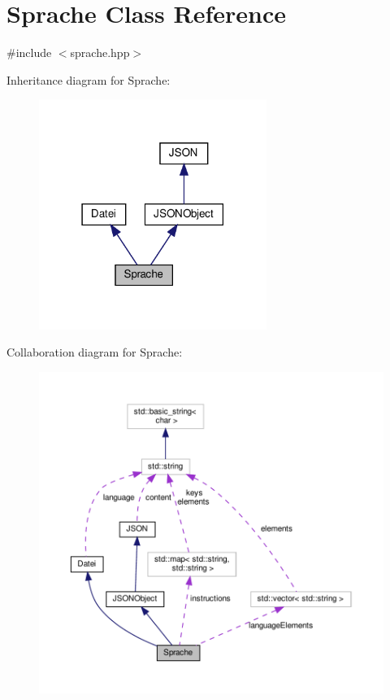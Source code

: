 \hypertarget{class_sprache}{}\section{Sprache Class Reference}
\label{class_sprache}


{\ttfamily \#include $<$sprache.\+hpp$>$}



Inheritance diagram for Sprache\+:
\nopagebreak
\begin{figure}[H]
\begin{center}
\leavevmode
\includegraphics[width=210pt]{class_sprache__inherit__graph}
\end{center}
\end{figure}


Collaboration diagram for Sprache\+:
\nopagebreak
\begin{figure}[H]
\begin{center}
\leavevmode
\includegraphics[width=350pt]{class_sprache__coll__graph}
\end{center}
\end{figure}
